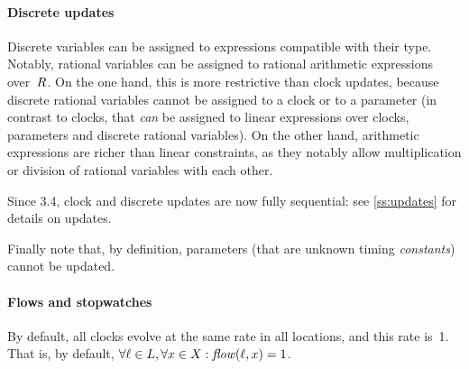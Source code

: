 \paragraph{Discrete updates}
Discrete variables can be assigned to expressions compatible with their type.
Notably, rational variables can be assigned to rational arithmetic expressions over~$R$.
On the one hand, this is more restrictive than clock updates, because discrete rational variables cannot be assigned to a clock or to a parameter (in contrast to clocks, that \emph{can} be assigned to linear expressions over clocks, parameters and discrete rational variables).
On the other hand, arithmetic expressions are richer than linear constraints, as they notably allow multiplication or division of rational variables with each other.

Since \imitator{} 3.4, clock and discrete updates are now fully sequential: see \cref{ss:updates} for details on updates.

Finally note that, by definition, parameters (that are unknown timing \emph{constants}) cannot be updated.

\paragraph{Flows and stopwatches}
By default, all clocks evolve at the same rate in all locations, and this rate is~1.
That is, by default, $\forall \ell \in L, \forall x \in X : \mathit{flow}(\ell, x) = 1$.

